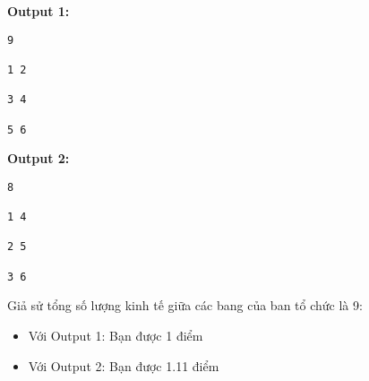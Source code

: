 \textbf{Output 1:}
\begin{verbatim}
9

1 2

3 4

5 6\end{verbatim}

\textbf{Output 2:}
\begin{verbatim}
8

1 4

2 5

3 6\end{verbatim}

Giả sử tổng số lượng kinh tế giữa các bang của ban tổ chức là 9:
\begin{itemize}
	\item Với Output 1: Bạn được 1 điểm
	\item Với Output 2: Bạn được 1.11 điểm
\end{itemize}